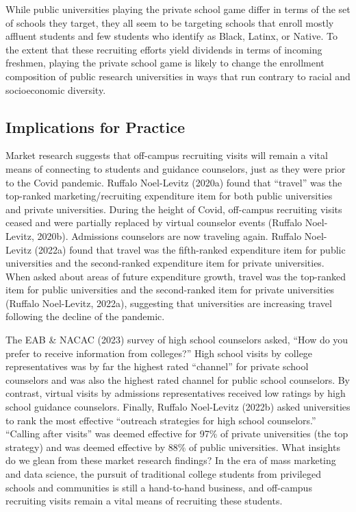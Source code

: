 \documentclass[
  12pt,
]{article}
\begin{document}
While public universities playing the private school game differ in terms of the set of schools they target, they all seem to be targeting schools that enroll mostly affluent students and few students who identify as Black, Latinx, or Native. To the extent that these recruiting efforts yield dividends in terms of incoming freshmen, playing the private school game is likely to change the enrollment composition of public research universities in ways that run contrary to racial and socioeconomic diversity.

\hypertarget{implications-for-practice}{%
\subsection{Implications for Practice}\label{implications-for-practice}}

Market research suggests that off-campus recruiting visits will remain a vital means of connecting to students and guidance counselors, just as they were prior to the Covid pandemic. Ruffalo Noel-Levitz (2020a) found that ``travel'' was the top-ranked marketing/recruiting expenditure item for both public universities and private universities. During the height of Covid, off-campus recruiting visits ceased and were partially replaced by virtual counselor events (Ruffalo Noel-Levitz, 2020b). Admissions counselors are now traveling again. Ruffalo Noel-Levitz (2022a) found that travel was the fifth-ranked expenditure item for public universities and the second-ranked expenditure item for private universities. When asked about areas of future expenditure growth, travel was the top-ranked item for public universities and the second-ranked item for private universities (Ruffalo Noel-Levitz, 2022a), suggesting that universities are increasing travel following the decline of the pandemic.

The EAB \& NACAC (2023) survey of high school counselors asked, ``How do you prefer to receive information from colleges?'' High school visits by college representatives was by far the highest rated ``channel'' for private school counselors and was also the highest rated channel for public school counselors. By contrast, virtual visits by admissions representatives received low ratings by high school guidance counselors. Finally, Ruffalo Noel-Levitz (2022b) asked universities to rank the most effective ``outreach strategies for high school counselors.'' ``Calling after visits'' was deemed effective for 97\% of private universities (the top strategy) and was deemed effective by 88\% of public universities. What insights do we glean from these market research findings? In the era of mass marketing and data science, the pursuit of traditional college students from privileged schools and communities is still a hand-to-hand business, and off-campus recruiting visits remain a vital means of recruiting these students.
\end{document}
